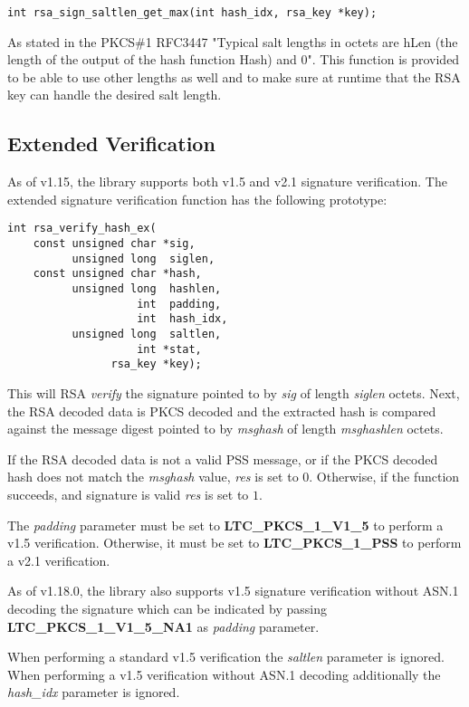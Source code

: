 \documentclass[synpaper]{book}
\begin{document}
\begin{verbatim}
int rsa_sign_saltlen_get_max(int hash_idx, rsa_key *key);
\end{verbatim}

As stated in the PKCS\#1 RFC3447 "Typical salt lengths in octets are hLen
(the length of the output of the hash function Hash) and 0".
This function is provided to be able to use other lengths as well and to make
sure at runtime that the RSA key can handle the desired salt length.

\subsection{Extended Verification}

As of v1.15, the library supports both v1.5 and v2.1 signature verification.  The extended signature verification function has the following prototype:

\begin{verbatim}
int rsa_verify_hash_ex(
    const unsigned char *sig,
          unsigned long  siglen,
    const unsigned char *hash,
          unsigned long  hashlen,
                    int  padding,
                    int  hash_idx,
          unsigned long  saltlen,
                    int *stat,
                rsa_key *key);
\end{verbatim}

This will RSA \textit{verify} the signature pointed to by \textit{sig} of length \textit{siglen} octets.  Next, the RSA decoded data is PKCS decoded
and the extracted hash is compared against the message digest pointed to by \textit{msghash} of length \textit{msghashlen} octets.

If the RSA decoded data is not a valid PSS message, or if the PKCS decoded hash does not match the \textit{msghash}
value, \textit{res} is set to $0$.  Otherwise, if the function succeeds, and signature is valid \textit{res} is set to $1$.

The \textit{padding} parameter must be set to \textbf{LTC\_PKCS\_1\_V1\_5} to perform a v1.5 verification.  Otherwise, it must be set to
\textbf{LTC\_PKCS\_1\_PSS} to perform a v2.1 verification.

As of v1.18.0, the library also supports v1.5 signature verification without ASN.1 decoding the signature which can be indicated by passing
\textbf{LTC\_PKCS\_1\_V1\_5\_NA1} as \textit{padding} parameter.

When performing a standard v1.5 verification the \textit{saltlen} parameter is ignored.
When performing a v1.5 verification without ASN.1 decoding additionally the \textit{hash\_idx} parameter is ignored.
\end{document}
